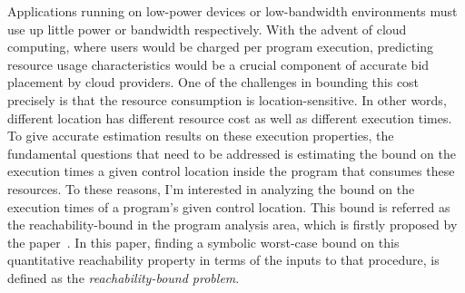{Applications running on low-power devices or low-bandwidth environments must use up little power or bandwidth respectively. 
With the advent of cloud computing, where users would be charged per program execution,
predicting resource usage characteristics would be a crucial component of accurate bid placement by cloud providers. 
One of the challenges in bounding this cost precisely is that the resource consumption is location-sensitive.
In other words, different location has different resource cost as well as different execution times.
To give accurate estimation results on these execution properties,
the fundamental questions that need to be addressed 
is estimating the bound on the execution times
a given control location inside the program that consumes these resources.
To these reasons, I'm interested in analyzing the bound on the execution times of a program's given control location.
This bound is referred as the reachability-bound in the program analysis area,
which is firstly proposed by the paper~\cite{GulwaniZ10}.
In this paper, finding a symbolic worst-case bound on this quantitative reachability property
in terms of the inputs to that procedure,
is defined as the \emph{reachability-bound problem}.
}

